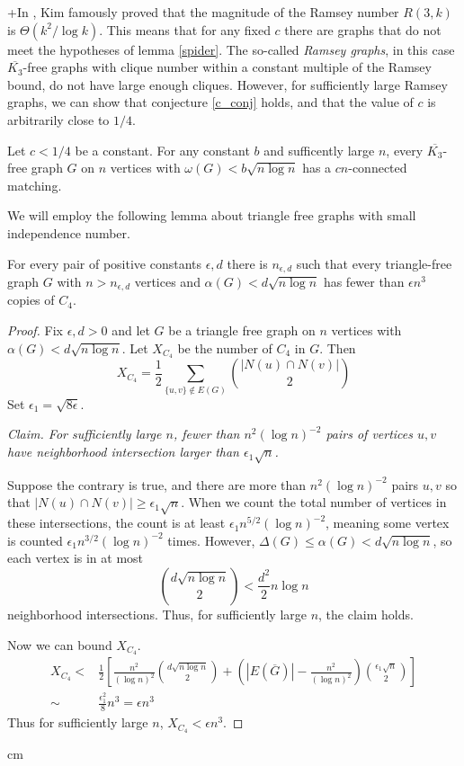 +In \cite{MR1369063}, Kim famously proved that the magnitude of the Ramsey number $R(3,k)$ is $\Theta(k^2/\log k)$.  This means that for any fixed $c$ there are graphs that do not meet the hypotheses of lemma \ref{spider}.  The so-called \textit{Ramsey graphs}, in this case $\overline{K_3}$-free graphs with clique number within a constant multiple of the Ramsey bound, do not have large enough cliques.  However, for sufficiently large Ramsey graphs, we can show that conjecture \ref{c_conj} holds, and that the value of $c$ is arbitrarily close to $1/4$. 

\begin{theorem}
Let $c < 1/4$ be a constant.  For any constant $b$ and sufficently large $n$, every $\overline{K_3}$-free graph $G$ on $n$ vertices with $\omega(G) < b\sqrt{n\log n}$ has a $cn$-connected matching.
\label{sm_cli}
\end{theorem}

We will employ the following lemma about triangle free graphs with small independence number.

\begin{lem}
For every pair of positive constants $\epsilon, d$ there is $n_{\epsilon, d}$ such that every triangle-free graph $G$ with $n > n_{\epsilon, d}$ vertices and $\alpha(G) < d\sqrt{n\log n}$ has fewer than $\epsilon n^3$ copies of $C_4$.
\end{lem}
\begin{proof}
Fix $\epsilon, d> 0$ and let $G$ be a triangle free graph on $n$ vertices with $\alpha(G) < d\sqrt{n\log n}$.  Let $X_{C_4}$ be the number of $C_4$ in $G$.  Then
\[X_{C_4} = \frac{1}{2}\sum_{\{u,v\}\notin E(G)} {|N(u) \cap N(v)| \choose 2}\]
Set $\epsilon_1 = \sqrt{8\epsilon}$.

\noindent\textit{Claim. For sufficiently large $n$, fewer than $n^2(\log n)^{-2}$ pairs of vertices $u,v$ have neighborhood intersection larger than $\epsilon_1\sqrt{n}$.}

Suppose the contrary is true, and there are more than $n^2(\log n)^{-2}$ pairs $u,v$ so that $|N(u)\cap N(v)| \geq \epsilon_1\sqrt{n}$. When we count the total number of vertices in these intersections, the count is at least $\epsilon_1n^{5/2}(\log n)^{-2}$, meaning some vertex is counted $\epsilon_1n^{3/2}(\log n)^{-2}$ times.  However, $\Delta(G) \leq \alpha(G) < d\sqrt{n\log n}$, so each vertex is in at most \[{d\sqrt{n\log n}\choose 2 } < \frac{d^2}{2}n\log n\] neighborhood intersections.  Thus, for sufficiently large $n$,  the claim holds.

Now we can bound $X_{C_4}$.
\begin{eqnarray}X_{C_4} <& \frac{1}{2}\left[\frac{n^2}{(\log n)^2}{d\sqrt{n\log n}\choose 2}+ \left(|E(\overline{G})|- \frac{n^2}{(\log n)^2}\right){\epsilon_1\sqrt{n}\choose 2}\right]\\
\sim& \frac{\epsilon_1^2}{8}n^3 = \epsilon n^3
\end{eqnarray}
Thus for sufficiently large $n$, $X_{C_4} < \epsilon n^3$.
\end{proof}
 cm
 
